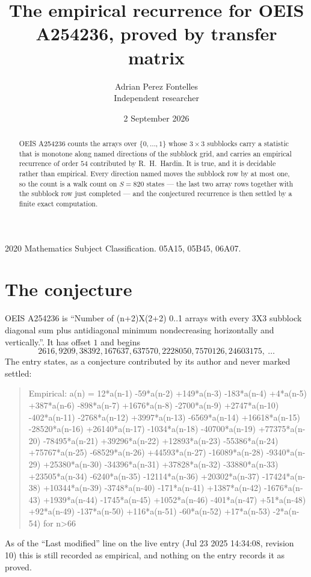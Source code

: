 \documentclass[11pt,a4paper]{article}
\title{The empirical recurrence for OEIS A254236, proved by transfer matrix}
\author{Adrian Perez Fontelles\\ \small Independent researcher}
\date{2 September 2026}
\theoremstyle{plain}
\theoremstyle{definition}
\begin{document}
\maketitle

\begin{abstract}
OEIS A254236 counts the arrays over $\{0,\dots,1\}$ whose $3\times3$ subblocks carry a
statistic that is monotone along named directions of the subblock grid, and carries an
empirical recurrence of order $54$ contributed by R.~H.~Hardin. It is true, and it is
decidable rather than empirical. Every direction named moves the subblock row by at most one,
so the count is a walk count on $S=820$ states --- the last two array rows together with the
subblock row just completed --- and the conjectured recurrence is then settled by a finite
exact computation.
\end{abstract}

\noindent\small 2020 Mathematics Subject Classification. 05A15, 05B45, 06A07.\normalsize

\section{The conjecture}

OEIS A254236 is ``Number of (n+2)X(2+2) 0..1 arrays with every 3X3 subblock diagonal sum plus antidiagonal minimum nondecreasing horizontally and vertically.''. It has offset $1$ and begins
\[
2616, 9209, 38392, 167637, 637570, 2228050, 7570126, 24603175,\ \dots
\]
The entry states, as a conjecture contributed by its author and never marked settled:
\begin{quote}
Empirical: a(n) = 12*a(n-1) -59*a(n-2) +149*a(n-3) -183*a(n-4) +4*a(n-5) +387*a(n-6) -898*a(n-7) +1676*a(n-8) -2700*a(n-9) +2747*a(n-10) -402*a(n-11) -2768*a(n-12) +3997*a(n-13) -6569*a(n-14) +16618*a(n-15) -28520*a(n-16) +26140*a(n-17) -1034*a(n-18) -40700*a(n-19) +77375*a(n-20) -78495*a(n-21) +39296*a(n-22) +12893*a(n-23) -55386*a(n-24) +75767*a(n-25) -68529*a(n-26) +44593*a(n-27) -16089*a(n-28) -9340*a(n-29) +25380*a(n-30) -34396*a(n-31) +37828*a(n-32) -33880*a(n-33) +23505*a(n-34) -6240*a(n-35) -12114*a(n-36) +20302*a(n-37) -17424*a(n-38) +10344*a(n-39) -3748*a(n-40) -171*a(n-41) +1387*a(n-42) -1676*a(n-43) +1939*a(n-44) -1745*a(n-45) +1052*a(n-46) -401*a(n-47) +51*a(n-48) +92*a(n-49) -137*a(n-50) +116*a(n-51) -60*a(n-52) +17*a(n-53) -2*a(n-54) for n>66
\end{quote}
As of the ``Last modified'' line on the live entry (Jul 23 2025 14:34:08, revision 10) this is still
recorded as empirical, and nothing on the entry records it as proved.
\end{document}
